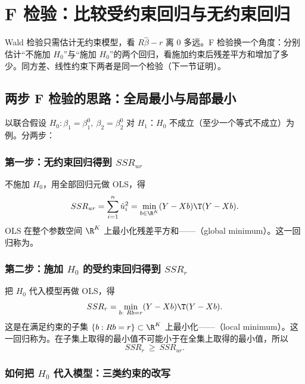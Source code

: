 \section{F 检验：比较受约束回归与无约束回归}\label{sec:U06b-F}

Wald 检验只需估计无约束模型，看 $R\hat\beta-r$ 离 0 多远。F 检验换一个角度：分别估计“不施加 $H_0$”与“施加 $H_0$”的两个回归，看施加约束后残差平方和增加了多少。同方差、线性约束下两者是同一个检验（下一节证明）。

\subsection{两步 F 检验的思路：全局最小与局部最小}

以联合假设 $H_0:\beta_1=\beta_1^0,\ \beta_2=\beta_2^0$ 对 $H_1$：$H_0$ 不成立（至少一个等式不成立）为例。分两步：

\subsubsection{第一步：无约束回归得到 \texorpdfstring{$SSR_{ur}$}{SSR_ur}}

不施加 $H_0$，用全部回归元做 OLS，得
\[
SSR_{ur}=\sum_{i=1}^n\hat u_i^2=\min_{b\in\R^K}(Y-Xb)\T(Y-Xb).
\]
OLS 在整个参数空间 $\R^K$ 上最小化残差平方和——（global minimum）。这一回归称为。

\subsubsection{第二步：施加 \texorpdfstring{$H_0$}{H0} 的受约束回归得到 \texorpdfstring{$SSR_r$}{SSR_r}}

把 $H_0$ 代入模型再做 OLS，得
\[
SSR_r=\min_{b:\ Rb=r}(Y-Xb)\T(Y-Xb).
\]
这是在满足约束的子集 $\{b:Rb=r\}\subset\R^K$ 上最小化——（local minimum）。这一回归称为。在子集上取得的最小值不可能小于在全集上取得的最小值，所以
\[
SSR_r\ \ge\ SSR_{ur}.
\]

\subsubsection{如何把 \texorpdfstring{$H_0$}{H0} 代入模型：三类约束的改写}

